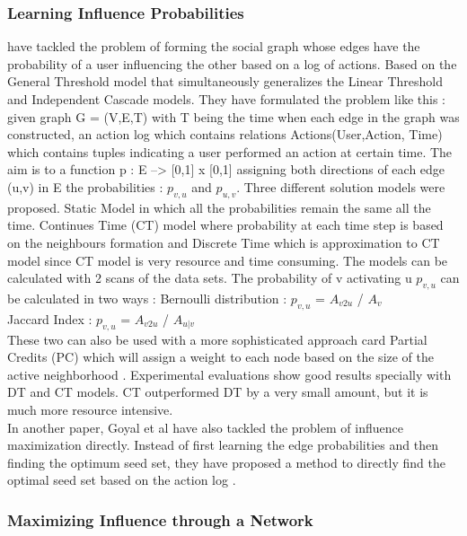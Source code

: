\documentclass[english]{tktltiki}
\begin{document}
\subsubsection{Learning Influence Probabilities}
\cite{goyal10} have tackled the problem of forming the social graph whose edges have the probability of a user
influencing the other based on a log of actions. Based on the General Threshold model that simultaneously 
generalizes the Linear Threshold and Independent Cascade models. They have formulated the problem like this :
given graph G = (V,E,T) with T being the time when each edge in the graph was constructed, an action log which contains relations Actions(User,Action, Time) which contains tuples indicating a user performed an action at certain time. The aim is to a function p : E --> [0,1] x [0,1] assigning both directions of each edge (u,v) in E the probabilities : $p_{v,u}$ and $p_{u,v}$.
Three different solution models were proposed. Static Model in which all the probabilities remain the same all the time. Continues Time (CT) model where probability at each time step is based on the neighbours formation and Discrete Time which is approximation to CT model since CT model is very resource and time consuming. 
The models can be calculated with 2 scans of the data sets. The probability of v activating u $p_{v,u}$ can be calculated in two ways : 
Bernoulli distribution :  $p_{v,u}$ =  $A_{v2u}$ / ${A_v}$ \\
Jaccard Index : $p_{v,u}$ =  $A_{v2u}$ / $A_{u|v}$ \\ 
These two can also be used with a more sophisticated approach card Partial Credits (PC) which will assign a 
weight to each node based on the size of the active neighborhood . Experimental evaluations show good results 
specially with DT and CT models. CT outperformed DT by a very small amount, but it is much more resource intensive. \\
In another paper, Goyal et al \cite{goyal11} have also tackled the problem of influence maximization directly. Instead of first learning the edge probabilities and then finding the optimum seed set, they have proposed a method to directly find the optimal seed set based on the action log .

\subsubsection{Maximizing Influence through a Network}
\end{document}

